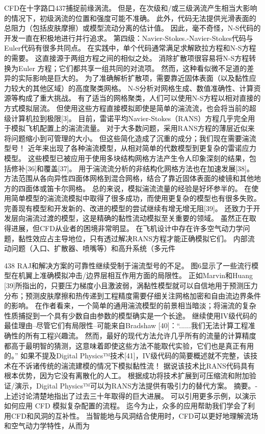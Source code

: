 \documentclass[UTF8,11pt,a4paper,openany,fontset=fandol]{ctexbook}
\begin{document}
CFD在十字路口437捕捉前缘涡流。 但是，在次级和/或三级涡流产生相当大影响的情况下，初级涡流的位置和强度可能不准确。 此外，代码无法提供光滑表面的总阻力（包括皮肤摩擦）或模型流动分离的估计值。 因此，毫不奇怪，N-S代码的开发一直在积极地进行并行追求。 第四级：Navier-Stokes.-Navier-Stokes代码与Euler代码有很多共同点。 在实践中，单个代码通常满足求解欧拉方程和N-S方程的需要。 这直接源于两组方程之间的相似之处。 消除扩散项很容易将N-S方程转换为Euler 方程；它们都共享一组共同的对流项。 然而，这种看似微不足道的差异的实际影响是巨大的。 为了准确解析扩散项，需要靠近固体表面（以及黏性应力较大的其他区域）的高度聚类网格。 N-S分析对网格生成、数值准确性、计算资源等构成了重大挑战。 有了适当的网格聚类，人们可以使用N-S方程以相对直接的方式模拟层流。 但使用这些方程直接模拟即使是简单的湍流流，也会将当前的超级计算机拉到极限[3]。 目前，雷诺平均Navier-Stokes（RANS）方程几乎完全用于模拟飞机配置上的湍流流量。 对于大多数问题，采用RANS方程的薄层近似来将问题缩小到可管理的大小。 但这些简化造成了沉重的成分；我们现在需要湍流型号！ 近年来出现了各种湍流模型，从相对简单的代数模型到更复杂的雷诺应力模型。 这些模型已被应用于使用多块结构网格方法产生令人印象深刻的结果，包括修补[36]和覆盖[37]。 用于湍流流分析的非结构化网格方法也在加速发展[38]。 方法范围从各向异性四面体网格到混合网格，结合了靠近固体表面的棱镜和其他地方的四面体或笛卡尔网格。 总的来说，模拟湍流流量的经验是好坏参半的。 在使用简单模型的湍流流模拟中取得了很多成功，而使用更复杂的模型也有很多失败。 完善现有模型和开发新的、改进的模型的尝试继续有增无增无阻[39]。 还致力于开发层向湍流过渡的模型，这是精确的黏性流动模拟至关重要的领域。 虽然正在取得进展，但CFD从业者的困境非常明显。 在飞机设计中存在许多空气动力学问题，黏性效应占主导地位，只有透过解决RANS方程才能正确模拟它们。 内部流动问题（入口、扩散器、喷嘴等）和高升系统（多元件

438 RAJ和解决方案的可靠性继续受制于湍流型号的不足。 图6显示了一些流行模型在机翼上准确模拟冲击/边界层相互作用方面的局限性。 正如Marvin和Huang [39]所指出的，只要压力梯度小且激波弱，涡黏性模型就可以自信地用于预测压力分布；预测皮肤摩擦和热传递到工程精度需要仔细关注网格加密和自由流边界条件的影响。 在作者看来，一个简单的通用湍流模型的前景相当暗淡；将湍流的复杂性质捕捉到一个具有少数自由参数的模型确实是一个长途。 继续使用IV级代码的最佳理由--尽管它们有局限性--可能来自Bradshaw [40]：“......我们无法计算工程准确性的所有工程兴趣流。 然而，最好的现代方法允许几乎所有的流量的计算精度都高于最明智的猜测，这意味着即使这些方法不能取代实验，它们也是真正有用的。” 如果不提及Digital Physics™技术[41]，IV级代码的简要概述就不完整，该技术在不诉诸传统的湍流建模的情况下模拟黏性流！ 据说该技术比RANS代码具有根本优势，因为它没有离散化的人工。 根据成功将技术扩展到可压缩流和附加验证/演示，Digital Physics™可以为RANS方法提供有吸引力的替代方案。 摘要。-上述讨论清楚地指出了过去三十年取得的巨大进展。 可以引用更多示例，以演示如何应用 CFD 模拟复杂配置的流程。 迄今为止，众多的应用帮助我们学会了利用CFD和风洞的互补性。 当智能地与风洞结合使用时，CFD可以更好地理解流场和空气动力学特性，从而为
\end{document}
